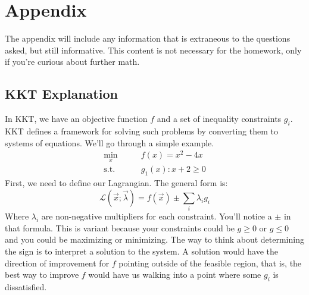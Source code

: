 \section*{Appendix}
The appendix will include any information that is extraneous to the questions asked, but still informative. This content is not necessary for the homework, only if you're curious about further math.

\subsection{KKT Explanation}
In KKT, we have an objective function $f$ and a set of inequality constraints $g_i$. KKT defines a framework for solving such problems by converting them to systems of equations. We'll go through a simple example.
\begin{align*}
    \min_{x} \qquad & f(x) = x^2-4x \\
    \text{s.t.} \qquad & g_{1}(x): x + 2 \geq 0
\end{align*}
First, we need to define our Lagrangian. The general form is:
$$\mathcal{L}(\vec{x};\vec{\lambda}) = f(\vec{x}) \pm \sum_i \lambda_ig_i$$
Where $\lambda_i$ are non-negative multipliers for each constraint. You'll notice a $\pm$ in that formula. This is variant because your constraints could be $g\geq 0$ or $g\leq 0$ and you could be maximizing or minimizing. The way to think about determining the sign is to interpret a solution to the system. A solution would have the direction of improvement for $f$ pointing outside of the feasible region, that is, the best way to improve $f$ would have us walking into a point where some $g_i$ is dissatisfied.

